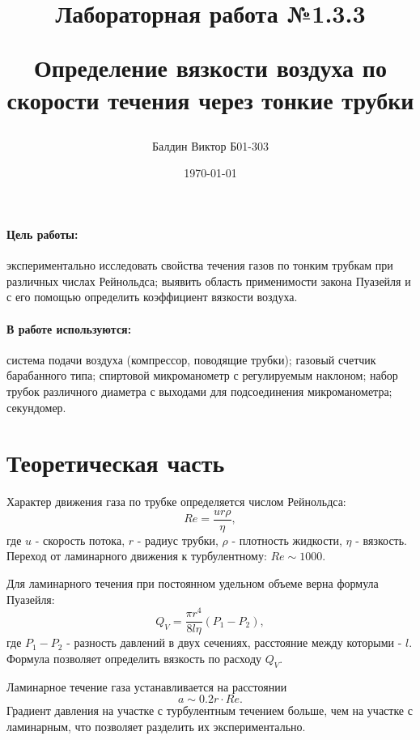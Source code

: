 \documentclass[12pt]{article}
\title{\begin{center}Лабораторная работа №1.3.3\end{center}
Определение вязкости воздуха по скорости течения через тонкие трубки}
\author{Балдин Виктор Б01-303}
\date{\today}
\begin{document}
\maketitle

\paragraph*{\textbf{Цель работы:}} экспериментально исследовать свойства течения газов по тонким трубкам при
различных числах Рейнольдса; выявить область применимости закона Пуазейля и с его помощью
определить коэффициент вязкости воздуха.
\paragraph*{\textbf{В работе используются:}} система подачи воздуха (компрессор, поводящие трубки); газовый
счетчик барабанного типа; спиртовой микроманометр с регулируемым наклоном; набор трубок
различного диаметра с выходами для подсоединения микроманометра; секундомер.

\section{Теоретическая часть}
	Характер движения газа по трубке определяется числом Рейнольдса:
	\begin{equation}
		Re = \frac{u r \rho}{\eta},
		\label{eq:Re}
	\end{equation}
	где $u$ - скорость потока, $r$ - радиус трубки, $\rho$ - плотность жидкости, $\eta$ - вязкость. Переход от ламинарного движения к турбулентному: $Re \sim 1000$.

	Для ламинарного течения при постоянном удельном объеме верна формула Пуазейля:
	\begin{equation}
		Q_V = \frac{\pi r^4}{8 l \eta}(P_1 - P_2),
		\label{eq:Pu}
	\end{equation}
	где $P_1 - P_2$ - разность давлений в двух сечениях, расстояние между которыми - $l$. Формула позволяет определить вязкость по расходу $Q_V$.

	Ламинарное течение газа устанавливается на расстоянии
	\begin{equation}
		a \sim 0.2 r \cdot Re.
		\label{eq:Aa}
	\end{equation}
	Градиент давления на участке с турбулентным течением больше, чем на участке с ламинарным, что позволяет разделить их экспериментально.
\end{document}
